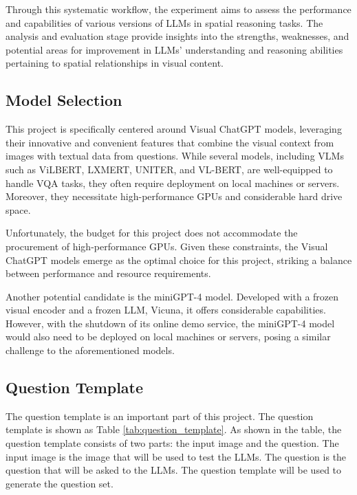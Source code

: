 \documentclass[twocolumn,11pt]{report}
\begin{document}
Through this systematic workflow, the experiment aims to assess the performance and capabilities of various versions of LLMs in spatial reasoning tasks. The analysis and evaluation stage provide insights into the strengths, weaknesses, and potential areas for improvement in LLMs' understanding and reasoning abilities pertaining to spatial relationships in visual content.

\subsection{Model Selection}
This project is specifically centered around Visual ChatGPT models, leveraging their innovative and convenient features that combine the visual context from images with textual data from questions\cite{wu2023visual}. While several models, including VLMs such as ViLBERT, LXMERT, UNITER, and VL-BERT, are well-equipped to handle VQA tasks, they often require deployment on local machines or servers. Moreover, they necessitate high-performance GPUs and considerable hard drive space.

Unfortunately, the budget for this project does not accommodate the procurement of high-performance GPUs. Given these constraints, the Visual ChatGPT models emerge as the optimal choice for this project, striking a balance between performance and resource requirements.

Another potential candidate is the miniGPT-4 model\cite{zhu2023minigpt4}. Developed with a frozen visual encoder and a frozen LLM, Vicuna, it offers considerable capabilities. However, with the shutdown of its online demo service, the miniGPT-4 model would also need to be deployed on local machines or servers, posing a similar challenge to the aforementioned models.


\subsection{Question Template}
The question template is an important part of this project. The question template is shown as Table \ref{tab:question_template}. As shown in the table, the question template consists of two parts: the input image and the question. The input image is the image that will be used to test the LLMs. The question is the question that will be asked to the LLMs. The question template will be used to generate the question set.
\end{document}
